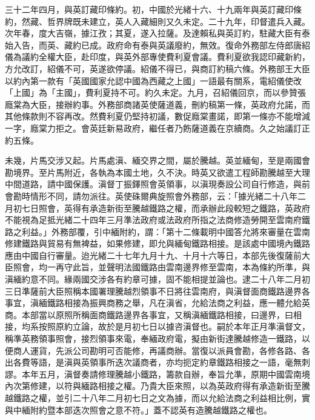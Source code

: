 \begin{pinyinscope}
三十二年四月，與英訂藏印條約。初，中國於光緒十六、十九兩年與英訂藏印條約，然藏、哲界牌既未建立，英人入藏細則又久未定。二十九年，印督遣兵入藏。次年春，度大吉嶺，據江孜；其夏，遂入拉薩。及達賴私與英訂約，駐藏大臣有泰始入告，而英、藏約已成。政府命有泰與英議廢約，無效。復命外務部左侍郎唐紹儀為議約全權大臣，赴印度，與英外部專使費利夏會議。費利夏欲我認印藏新約，方允改訂，紹儀不可，英遂欲停議。紹儀不得已，與商訂約稿六條。外務部王大臣以約內第一款有「英國國家允認中國為西藏之上國」一語最有關系，電紹儀使改「上國」為「主國」，費利夏持不可。約久未定。九月，召紹儀回京，而以參贊張廕棠為大臣，接辦約事。外務部商諸英使薩道義，刪約稿第一條，英政府允諾，而其他條款則不容再改。然費利夏仍堅持初議，數促廕棠畫諾，即第一條亦不能增減一字，廕棠力拒之。會英廷新易政府，繼任者乃飭薩道義在京續商。久之始議訂正約五條。

未幾，片馬交涉又起。片馬處滇、緬交界之間，屬於騰越。英並緬甸，至是兩國會勘境界。至片馬附近，各執為本國土地，久不決。時英又欲遣工程師勘騰越至大理中間道路，請中國保護。滇督丁振鐸照會英領事，以滇現奏設公司自行修造，與前會勘時情形不同，請勿派往。英使硃爾典旋照會外務部，云：「據光緒二十八年二月初七日照會，英得有承造新街至騰越鐵路之權，而承辦此段較短之鐵路，英政府不能視為足抵光緒二十四年三月準法政府或法政府所指之法商修造勞開至雲南府鐵路之利益。」外務部覆，引中緬附約，謂：「第十二條載明中國答允將來審量在雲南修建鐵路與貿易有無裨益，如果修建，即允與緬甸鐵路相接。是該處中國境內鐵路應由中國自行審量。迨光緒二十七年九月十九、十月十六等日，本部先後復薩前大臣照會，均一再守此旨，並聲明法國鐵路由雲南邊界修至雲南，本為條約所準，與滇緬約意不同。緣兩國交涉各有約章可據，固不能相提並論也。逮二十八年二月初三日準薩前大臣照稱本國署理騰越烈領事不日將往雲南府，與滇督面商鐵路邊界各事宜，滇緬鐵路相接為振興商務之舉，凡在滇省，允給法商之利益，應一體允給英商。本部當以原照所稱面商鐵路邊界各事宜，又稱滇緬鐵路相接，曰邊界，曰相接，均系按照原約立論，故於是月初七日以據咨滇督也。嗣於本年正月準滇督文，稱準英務領事照會，接烈領事來電，奉緬政府電，擬由新街達騰越修造一鐵路，以便商人運貨，先派公司勘明可否能修，再議商辦。當復以派員會勘，各修各路、各出各費等語，是滇與英領事所迭次議商者，亦均扼定約章鐵路相接之一語，毫無刺謬。本年五月，滇督奏請修理騰越小鐵路，籌款自辦，奉旨允準，原期中國雲南境內次第修建，以符與緬路相接之權。乃貴大臣來照，以為英政府得有承造新街至騰越鐵路之權，並引二十八年二月初七日之文為據，而以允給法商之利益相比例，實與中緬附約暨本部迭次照會之意不符。」蓋不認英有造騰越鐵路之權也。


\end{pinyinscope}
